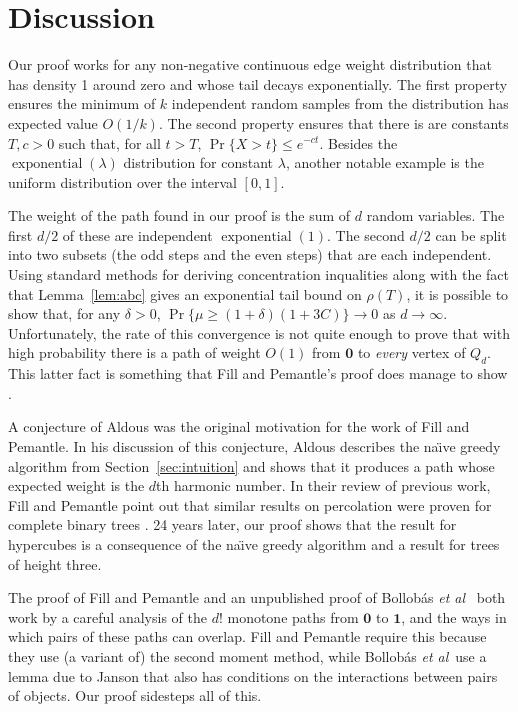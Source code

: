 \documentclass[a4paper,UKenglish]{lipics-v2016}
\DeclareMathOperator{\exponential}{exponential}
\newcommand{\zero}{\mathbf{0}}
\newcommand{\one}{\mathbf{1}}
\newcommand{\etal}{\emph{et al}}
\begin{document}
\section{Discussion}

Our proof works for any non-negative continuous edge weight distribution
that has density 1 around zero and whose tail decays exponentially.
The first property ensures the minimum of $k$ independent random
samples from the distribution has expected value $O(1/k)$. The second
property ensures that there is are constants $T,c>0$ such that, for all
$t>T$, $\Pr\{X > t\}\le e^{-ct}$.  Besides the $\exponential(\lambda)$
distribution for constant $\lambda$, another notable example is the
uniform distribution over the interval $[0,1]$.

The weight of the path found in our proof is the sum of $d$ random
variables. The first $d/2$ of these are independent $\exponential(1)$. The
second $d/2$ can be split into two subsets (the odd steps and the even
steps) that are each independent.  Using standard methods for deriving
concentration inqualities along with the fact that Lemma~\ref{lem:abc}
gives an exponential tail bound on $\rho(T)$, it is possible to show
that, for any $\delta >0$, $\Pr\{\mu\ge (1+\delta)(1+3C)\}\rightarrow 0$
as $d\rightarrow\infty$.  Unfortunately, the rate of this convergence
is not quite enough to prove that with high probability there is a path
of weight $O(1)$ from $\zero$ to \emph{every} vertex of $Q_d$.
This latter fact is something that Fill and Pemantle's proof does manage
to show \cite{fill.pemantle:percolation}.

A conjecture of Aldous \cite[Conjecture~G7.1]{aldous:probability}
was the original motivation for the work of Fill and Pemantle.  In his
discussion of this conjecture, Aldous describes the na\"{\i}ve greedy
algorithm from Section~\ref{sec:intuition} and shows that it produces a
path whose expected weight is the $d$th harmonic number.  In their review
of previous work, Fill and Pemantle \cite{fill.pemantle:percolation}
point out that similar results on percolation were proven for complete
binary trees \cite{pemantle:phase}.  24 years later, our proof shows
that the result for hypercubes is a consequence of the na\"{\i}ve greedy
algorithm and a result for trees of height three.

The proof of Fill and Pemantle \cite{fill.pemantle:percolation}
and an unpublished proof of Bollob\'as \etal\
\cite{balister.bollobas.ea:first-passage} both work by a careful analysis
of the $d!$ monotone paths from $\zero$ to $\one$, and the ways in which
pairs of these paths can overlap.  Fill and Pemantle require this because
they use (a variant of) the second moment method, while Bollob\'as \etal\
use a lemma due to Janson that also has conditions on the interactions
between pairs of objects. Our proof sidesteps all of this.
\end{document}
